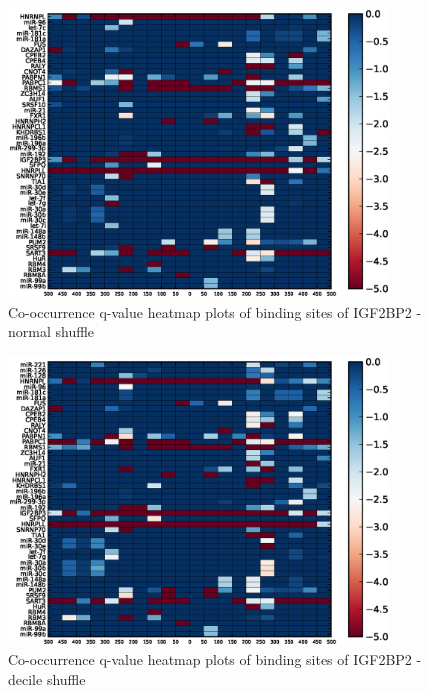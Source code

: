 \begin{figure}
   	\includegraphics[width=0.9\textwidth]{appendix1/figures/IGF2BP2_normal_expressed_heatmap_qvalues0.eps}
   	\caption{Co-occurrence q-value heatmap plots of binding sites of IGF2BP2 - normal shuffle}
\end{figure}
\clearpage
\begin{figure}
   	\includegraphics[width=0.9\textwidth]{appendix1/figures/IGF2BP2_decile_expressed_heatmap_qvalues0.eps}
   	\caption{Co-occurrence q-value heatmap plots of binding sites of IGF2BP2 - decile shuffle}
\end{figure}

